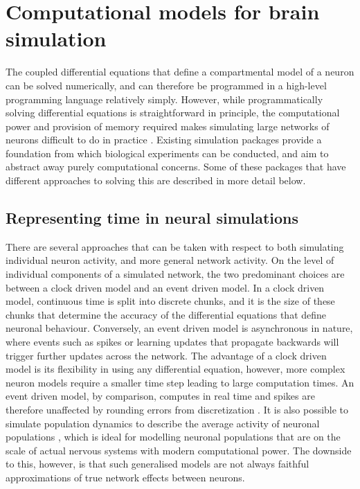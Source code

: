 

\section{Computational models for brain simulation}

The coupled differential equations that define a compartmental model of a neuron
can be solved numerically, and can therefore be programmed in a high-level
programming language relatively simply. However, while programmatically solving
differential equations is straightforward in principle, the computational power
and provision of memory required makes simulating large networks of neurons
difficult to do in practice \autocite{trappenberg_fundamentals_2009}. Existing
simulation packages provide a foundation from which biological experiments can
be conducted, and aim to abstract away purely computational concerns. Some of
these packages that have different approaches to solving this are described in
more detail below.

\subsection{Representing time in neural simulations}

There are several approaches that can be taken with respect to both simulating
individual neuron activity, and more general network activity. On the level of
individual components of a simulated network, the two predominant choices are
between a clock driven model and an event driven model. In a clock driven model,
continuous time is split into discrete chunks, and it is the size of these
chunks that determine the accuracy of the differential equations that define
neuronal behaviour. Conversely, an event driven model is asynchronous in nature,
where events such as spikes or learning updates that propagate backwards will
trigger further updates across the network. The advantage of a clock driven
model is its flexibility in using any differential equation, however, more
complex neuron models require a smaller time step leading to large computation
times. An event driven model, by comparison, computes in real time and spikes
are therefore unaffected by rounding errors from discretization
\autocite{brette_simulation_2007}. It is also possible to simulate population
dynamics to describe the average activity of neuronal populations
\autocite{trappenberg_fundamentals_2009}, which is ideal for modelling neuronal
populations that are on the scale of actual nervous systems with modern
computational power. The downside to this, however, is that such generalised
models are not always faithful approximations of true network effects between
neurons.

